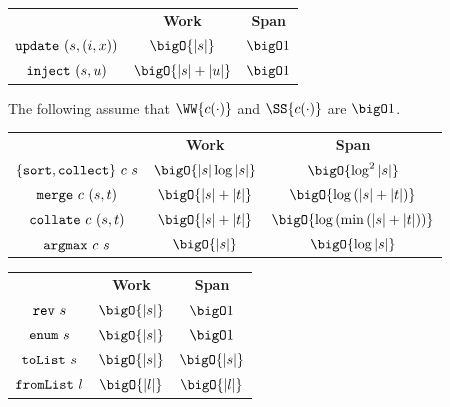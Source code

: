 \begin{costspec}[Updates]
\begin{tabular}{c|c|c}
& \textbf{Work} & \textbf{Span} \\
%
$\texttt{update}~(s,(i,x))$ &
$\bigO{|s|}$ &
$\bigO 1$ \\
%
$\texttt{inject}~(s,u)$ &
$\bigO{|s| + |u|}$ &
$\bigO 1$ \\
%
\end{tabular}
\end{costspec}

\begin{costspec}
The following assume that $\WW{c(\cdot)}$ and $\SS{c(\cdot)}$ are $\bigO 1$.
\begin{tabular}{c|c|c}
& \textbf{Work} & \textbf{Span} \\
%
$\{\texttt{sort},\texttt{collect}\}~c~s$ &
$\displaystyle \bigO{|s|\log{|s|}}$ &
$\displaystyle \bigO{\log^2{|s|}}$ \\
%
$\texttt{merge}~c~(s,t)$ &
$\displaystyle \bigO{|s| + |t|}$ &
$\displaystyle \bigO{\log\left(|s| + |t|\right)}$ \\
%
$\texttt{collate}~c~(s,t)$ &
$\displaystyle \bigO{|s| + |t|}$ &
$\displaystyle \bigO{\log\left(\min\left(|s| + |t|\right)\right)}$ \\
%
$\texttt{argmax}~c~s$ &
$\displaystyle \bigO{|s|}$ &
$\displaystyle \bigO{\log{|s|}}$ \\
%
\end{tabular}
\end{costspec}

\begin{costspec}[Miscellaneous]
\begin{tabular}{c|c|c}
& \textbf{Work} & \textbf{Span} \\
%
$\texttt{rev}~s$ &
$\displaystyle \bigO{|s|}$ &
$\displaystyle \bigO 1$ \\
%
$\texttt{enum}~s$ &
$\displaystyle \bigO{|s|}$ &
$\displaystyle \bigO 1$ \\
%
$\texttt{toList}~s$ &
$\bigO{|s|}$ &
$\bigO{|s|}$ \\
%
$\texttt{fromList}~l$ &
$\bigO{|l|}$ &
$\bigO{|l|}$ \\
%
\end{tabular}
\end{costspec}

